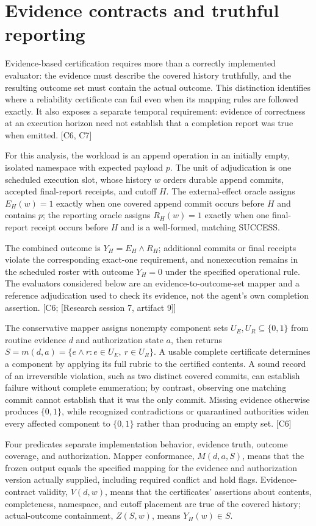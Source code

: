 \documentclass[11pt]{article}
\begin{document}
\section{Evidence contracts and truthful reporting}
Evidence-based certification requires more than a correctly implemented evaluator: the evidence must describe the covered history truthfully, and the resulting outcome set must contain the actual outcome. This distinction identifies where a reliability certificate can fail even when its mapping rules are followed exactly. It also exposes a separate temporal requirement: evidence of correctness at an execution horizon need not establish that a completion report was true when emitted. [C6, C7]

For this analysis, the workload is an append operation in an initially empty, isolated namespace with expected payload $p$. The unit of adjudication is one scheduled execution slot, whose history $w$ orders durable append commits, accepted final-report receipts, and cutoff $H$. The external-effect oracle assigns $E_H(w)=1$ exactly when one covered append commit occurs before $H$ and contains $p$; the reporting oracle assigns $R_H(w)=1$ exactly when one final-report receipt occurs before $H$ and is a well-formed, matching SUCCESS.

The combined outcome is $Y_H=E_H\land R_H$; additional commits or final receipts violate the corresponding exact-one requirement, and nonexecution remains in the scheduled roster with outcome $Y_H=0$ under the specified operational rule. The evaluators considered below are an evidence-to-outcome-set mapper and a reference adjudication used to check its evidence, not the agent\textquoteright{}s own completion assertion. [C6; [Research session 7, artifact 9]]

The conservative mapper assigns nonempty component sets $U_E,U_R\subseteq\{0,1\}$ from routine evidence $d$ and authorization state $a$, then returns $S=m(d,a)=\{e\land r:e\in U_E,\ r\in U_R\}$. A usable complete certificate determines a component by applying its full rubric to the certified contents. A sound record of an irreversible violation, such as two distinct covered commits, can establish failure without complete enumeration; by contrast, observing one matching commit cannot establish that it was the only commit. Missing evidence otherwise produces $\{0,1\}$, while recognized contradictions or quarantined authorities widen every affected component to $\{0,1\}$ rather than producing an empty set. [C6]

Four predicates separate implementation behavior, evidence truth, outcome coverage, and authorization. Mapper conformance, $M(d,a,S)$, means that the frozen output equals the specified mapping for the evidence and authorization version actually supplied, including required conflict and hold flags. Evidence-contract validity, $V(d,w)$, means that the certificates\textquoteright{} assertions about contents, completeness, namespace, and cutoff placement are true of the covered history; actual-outcome containment, $Z(S,w)$, means $Y_H(w)\in S$.
\end{document}
